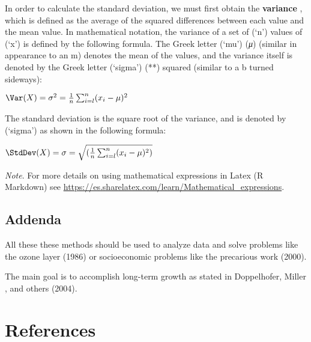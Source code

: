 \documentclass[
]{article}
\begin{document}
In order to calculate the standard deviation, we must first obtain the
\textbf{variance} , which is defined as the average of the squared
differences between each value and the mean value. In mathematical
notation, the variance of a set of (`n') values of (`x') is defined by
the following formula. The Greek letter (`mu') (\emph{μ}) (similar in
appearance to an m) denotes the mean of the values, and the variance
itself is denoted by the Greek letter (`sigma') (**) squared (similar to
a b turned sideways):

\(\Var(X) = \sigma^{2} = \frac{1}{n}\sum_{i = l}^{n} (x_{i} - \mu)^{2}\)

The standard deviation is the square root of the variance, and is
denoted by (`sigma') as shown in the following formula:

\(\StdDev(X) = \sigma = \sqrt{(\frac{1}{n}\sum_{i = l}^{n} (x_{i} - \mu)^{2})}\)

\emph{Note}. For more details on using mathematical expressions in Latex
(R Markdown) see
\url{https://es.sharelatex.com/learn/Mathematical_expressions}.

\hypertarget{addenda}{%
\subsection{Addenda}\label{addenda}}

All these these methods should be used to analyze data and solve
problems like the ozone layer (1986) or socioeconomic problems like the
precarious work (2000).

The main goal is to accomplish long-term growth as stated in
Doppelhofer, Miller , and others (2004).

\hypertarget{references}{%
\section{References}\label{references}}
\end{document}
